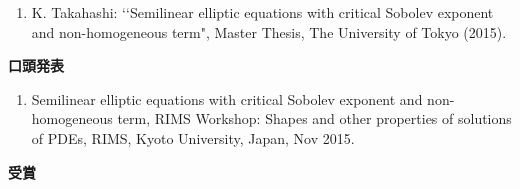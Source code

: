 \documentclass[a4j,twocolumn]{jarticle}
\begin{document}
\begin{enumerate}
\item K. Takahashi: \lq\lq Semilinear elliptic equations with critical
      Sobolev exponent and non-homogeneous term",
      Master Thesis, The University of Tokyo (2015).
\end{enumerate}

\vspace{0.2cm}
\noindent
{\bf 口頭発表}

\vspace{0.1cm}

\begin{enumerate}
\item Semilinear elliptic equations with critical Sobolev exponent and non-homogeneous term, RIMS Workshop: Shapes and other properties of solutions of PDEs, RIMS, Kyoto University, Japan, Nov 2015.
\end{enumerate}





\vspace{0.2cm}
\noindent
{\bf 受賞}

\vspace{0.1cm}
\end{document}

